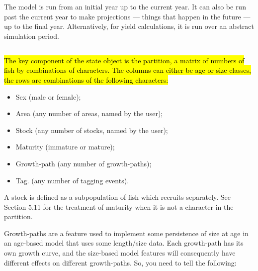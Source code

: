 The model is run from an initial year up to the current year. It can also be run past the current year to make projections — things that happen in the future — up to the final year. Alternatively, for yield calculations, it is run over an abstract simulation period.


\subsection{}

\hl{The key component of the state object is the partition, a matrix of numbers of fish by combinations of characters. The columns can either be age or size classes, the rows are combinations of the following characters:}


\begin{itemize}
\item Sex (male or female);
\item Area (any number of areas, named by the user);
\item Stock (any number of stocks, named by the user);
\item Maturity (immature or mature);
\item Growth-path (any number of growth-paths);
\item Tag. (any number of tagging events).
\end{itemize}

A stock is defined as a subpopulation of fish which recruits separately. See Section 5.11 for the treatment of maturity when it is not a character in the partition. 

Growth-paths are a feature used to implement some persistence of size at age in an age-based model that uses some length/size data. Each growth-path has its own growth curve, and the size-based model features will consequently  have different effects on different growth-paths. So, you need to tell \cas  the following: 

